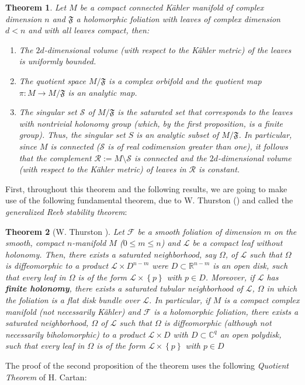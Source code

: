 \documentclass[12pt,twoside,a4paper]{report}
\newtheorem{theorem}{Theorem}[section]
\newcommand{\co}{\ensuremath{\mathbb C }}
\newcommand{\fsheaf}{\ensuremath{\mathcal F }}
\begin{document}
  \begin{theorem}\label{kahlerEMS}
  Let $M$ be a compact connected Kähler manifold
  of complex dimension $n$ and $\mathfrak{F}$ a holomorphic foliation
  with leaves of complex dimension $d<n$ and with all leaves compact,
  then:
  \begin{enumerate}
          \item[1] The $2d$-dimensional volume (with
                  respect to the Kähler metric) of the leaves is uniformly
                  bounded.
          \item[2] The quotient space $M/\mathfrak{F}$ is a complex orbifold and
          the quotient map $\pi:M\to{M/\mathfrak{F}}$ is an analytic map.

          \item[3] The singular set $\mathcal S$ of $M/\mathfrak{F}$ is the saturated set that corresponds to the leaves with nontrivial holonomy group (which, by the first proposition, is a finite group). Thus, the singular set $S$ is an analytic subset of $M/\mathfrak{F}$. In particular, since $M$ is connected ($\mathcal S$ is of real codimension greater than one), it follows that the complement ${\mathcal R}:=M\setminus{\mathcal S}$ is connected and the  $2d$-dimensional volume (with
  respect to the Kähler metric) of leaves in $\mathcal R$ is constant.
  \end{enumerate}
  \end{theorem}

  First, throughout this theorem and the following results, we are going to make use of the following fundamental theorem, due to W. Thurston (\cite{Thurston}) and called the {\it generalized Reeb stability theorem}:
  \begin{theorem}[W. Thurston \cite{Thurston}]\label{Reeb}
  Let $\fsheaf$ be a smooth foliation of dimension $m$ on the smooth, compact $n$-manifold $M$
  ($0\leq{m}\leq{n}$) and $\mathcal{L}$ be a compact leaf without holonomy. Then, there exists a \emph{saturated} neighborhood, say $\Omega$, of $\mathcal{L}$ such that $\Omega$ is diffeomorphic to a product $\mathcal{L}\times D^{n-m}$ were
  $D\subset{\mathbb R}^{n-m}$ is an open disk, such that every leaf in $\Omega$ is of the form $\mathcal{L}\times{\left\{p\right\}}$ with $p\in{D}$. Moreover, if $\mathcal{L}$ has \textbf{\emph{finite holonomy}}, there exists a \emph{saturated} tubular neighborhood of
  $\mathcal{L}$, $\Omega$ in which the foliation is a flat disk bundle over $\mathcal{L}$.
  In particular, if $M$ is a compact complex manifold (not necessarily Kähler) and $\fsheaf$ is a holomorphic foliation, there exists a saturated neighborhood, $\Omega$ of $\mathcal{L}$ such that $\Omega$ is diffeomorphic (although not necessarily biholomorphic) to a product
    $\mathcal{L}\times D$ with $D\subset\co^{q}$ an open polydisk, such that every leaf in $\Omega$ is of the form $\mathcal{L}\times{\left\{p\right\}}$ with $p\in{D}$
  \end{theorem}
  The proof of the second proposition of the theorem uses the following
  {\it Quotient Theorem} of H. Cartan:
\end{document}
